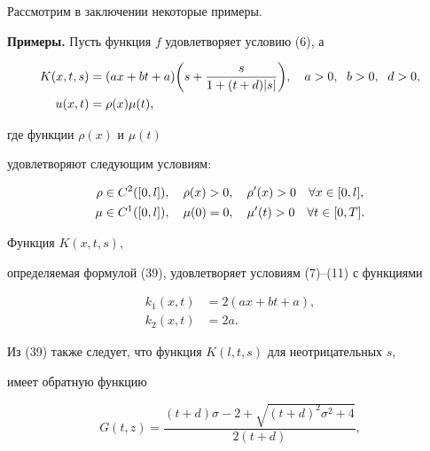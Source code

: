 Рассмотрим в заключении некоторые примеры.


\medskip





{\bf Примеры.} Пусть функция $f$ удовлетворяет условию (6), а


\begin{align}


K(x,t,s)&=(ax+bt+a)\biggl(s+\frac s{1+(t+d)|s|}\biggr),


\q a>0, \ \; b>0,\ \; d>0,  \\




u(x,t)&= \rho(x)\mu(t),




\end{align}


где функции $\rho(x)$ и $\mu(t)$


удовлетворяют следующим условиям:


\begin{gather}


\rho \in C^2([0,l]),\q \rho(x) > 0,\q \rho'(x) > 0


\q \forall x\in [0,l], \\




\mu \in C^1([0,l]),\q \mu(0)=0,\q \mu'(t)>0


\q \forall t\in [0,T].




\end{gather}


Функция $K(x,t,s)$,


определяемая формулой (39), удовлетворяет условиям (7)--(11) с функциями


\begin{align}


k_1(x,t)&=2(ax+bt+a),\\




k_2(x,t)&=2a.




\end{align}


Из (39) также следует, что функция $K(l,t,s)$ для неотрицательных $s$,


имеет обратную функцию


\begin{equation}


G(t,z) =\frac{(t+d)\sigma -2 + \sqrt{(t+d)^2\sigma^2 +


4}}{2(t+d)},




\end{equation}


